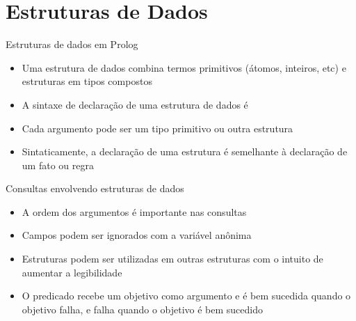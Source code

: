 \section{Estruturas de Dados}

\begin{frame}[fragile]{Estruturas de dados em Prolog}

    \begin{itemize}
        \item Uma estrutura de dados combina termos primitivos (átomos, inteiros, etc) e 
            estruturas em tipos compostos

        \item A sintaxe de declaração de uma estrutura de dados é 


        \item Cada argumento pode ser um tipo primitivo ou outra estrutura

        \item Sintaticamente, a declaração de uma estrutura é semelhante à declaração de um 
            fato ou regra


   \end{itemize}

\end{frame}

\begin{frame}[fragile]{Consultas envolvendo estruturas de dados}

    \begin{itemize}
        \item A ordem dos argumentos é importante nas consultas


        \item Campos podem ser ignorados com a variável anônima

        \item Estruturas podem ser utilizadas em outras estruturas com o intuito de aumentar a 
            legibilidade


        \item O predicado  recebe um objetivo como argumento e é bem 
            sucedida quando o objetivo falha, e falha quando o objetivo é bem sucedido

    \end{itemize}

\end{frame}

